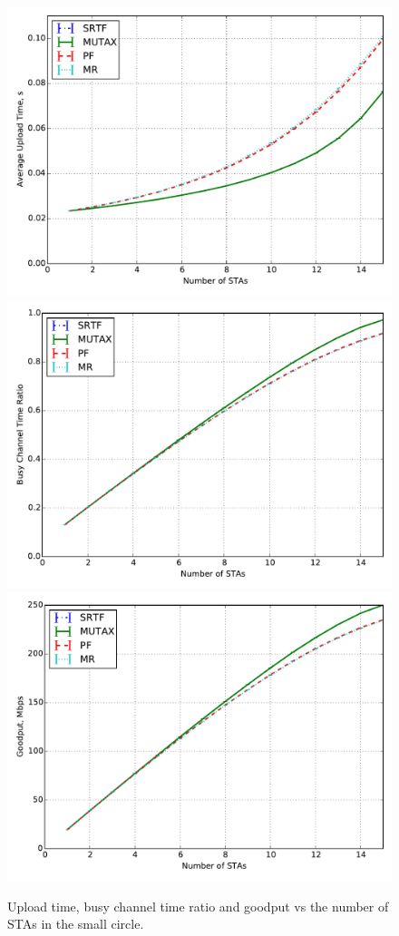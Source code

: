 \begin{figure}[!tb]
\centering
\includegraphics[width = 0.32\linewidth]{5-d.pdf}
\includegraphics[width = 0.32\linewidth]{5-e.pdf}
\includegraphics[width = 0.32\linewidth]{5-t.pdf}
%
\vspace{-0.5em}
\caption{\label{fig:10-e}  Upload time, busy channel time ratio and goodput vs the number of STAs in the small circle.}
\vspace{-0.5em}
\end{figure}

